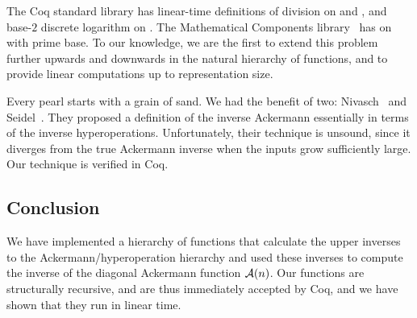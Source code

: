 {\color{red}The Coq standard library has linear-time definitions 
of division on  and , and base-$2$ discrete logarithm 
on .  The Mathematical Components library~\cite{MathComp} 
has  on  with prime base. 
To our knowledge, we are the first to extend this problem further 
upwards and downwards in the natural hierarchy of functions, and to
provide linear computations up to representation size.}

Every pearl starts with a grain of sand.  We had the benefit of two: 
Nivasch~\cite{nivasch} and Seidel~\cite{seidel}.
They proposed a definition of the inverse Ackermann essentially in terms of
the inverse hyperoperations.  Unfortunately, their technique is unsound, since it diverges from
the true Ackermann inverse when the inputs grow sufficiently large.  Our technique is verified in Coq.

\subsection{Conclusion}
We have implemented a hierarchy of functions that calculate the upper inverses
to the Ackermann/hyperoperation hierarchy and used these inverses
to compute the inverse of the diagonal Ackermann function $\mathcal{A}(n)$.
Our functions are structurally recursive, and are thus immediately accepted by Coq,
and we have shown that they run in linear time.







